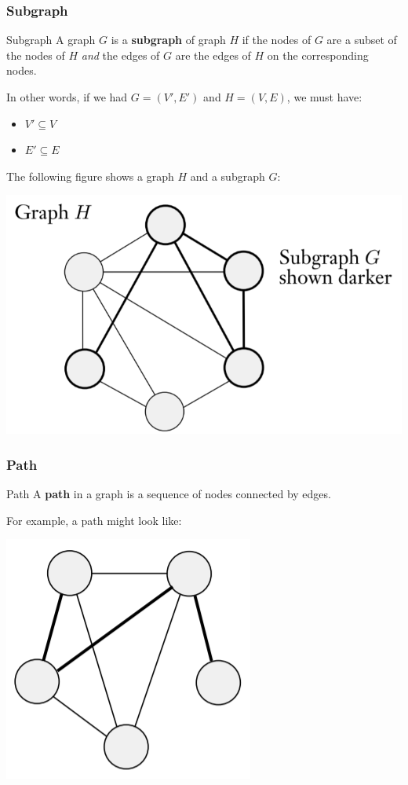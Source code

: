 \documentclass[letterpaper]{article}
\begin{document}
\subsubsection{Subgraph}
\begin{definition}{Subgraph}{}
    A graph $G$ is a \textbf{subgraph} of graph $H$ if the nodes of $G$ are a subset of the nodes of $H$ \emph{and} the edges of $G$ are the edges of $H$ on the corresponding nodes.
\end{definition}
In other words, if we had $G = (V', E')$ and $H = (V, E)$, we must have:
\begin{itemize}
    \item $V' \subseteq V$
    \item $E' \subseteq E$
\end{itemize}
The following figure shows a graph $H$ and a subgraph $G$:
\begin{center}
    \includegraphics[scale=0.5]{../assets/subgraph.png}
\end{center}

\subsubsection{Path}
\begin{definition}{Path}{}
    A \textbf{path} in a graph is a sequence of nodes connected by edges. 
\end{definition}
For example, a path might look like: 
\begin{center}
    \includegraphics[scale=0.5]{../assets/path.png}
\end{center}
\end{document}
